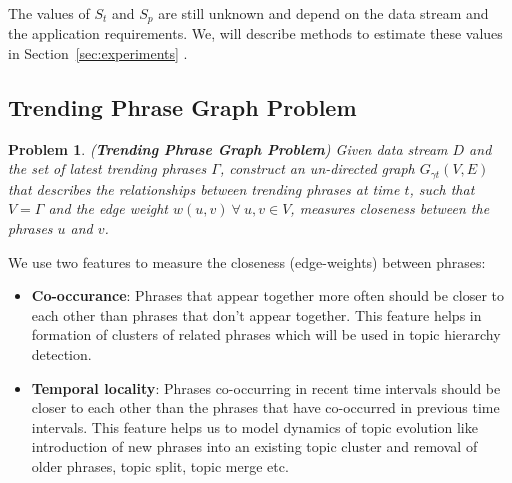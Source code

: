 \documentclass{sig-alternate}
\newtheorem{problem}{Problem}
\begin{document}

The values of $S_t$ and $S_p$ are still unknown and depend on the data stream and the application requirements. We, will describe methods to estimate these values in Section~\ref{sec:experiments} .


\subsection{Trending Phrase Graph Problem}
\begin{problem} (\textbf{Trending Phrase Graph Problem})
Given data stream $D$ and the set of latest trending phrases $\Gamma$, construct an un-directed graph $G_{\gamma t}(V, E)$  that describes the relationships between trending phrases at time $t$, such that $V = \Gamma$ and the edge weight $w(u, v)\ \forall\ u, v \in V$, measures closeness between the phrases $u$ and $v$.
\end{problem}

We use two features to measure the closeness (edge-weights) between phrases: 
\begin{itemize}
\item \textbf{Co-occurance}:  Phrases that appear together more often should be closer to each other than phrases that don't appear together. This feature helps in formation of clusters of related phrases which will be used in topic hierarchy detection.
\item \textbf{Temporal locality}: Phrases co-occurring in recent time intervals should be closer to each other than the phrases that have co-occurred in previous time intervals. This feature helps us to model dynamics of topic evolution like introduction of new phrases into an existing topic cluster and removal of older phrases, topic split, topic merge etc.
\end{itemize}
\end{document}
